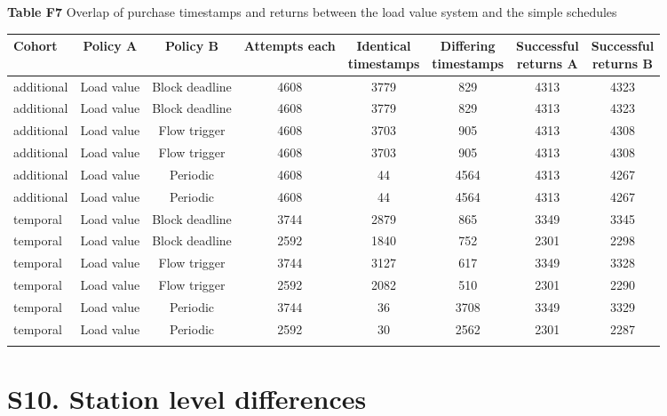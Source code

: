 \documentclass[lineno,pdflatex,sn-apa]{sn-jnl}%
\theoremstyle{thmstyleone}%
\theoremstyle{thmstyletwo}%
\theoremstyle{thmstylethree}%
\begin{document}
\begin{center}
\noindent\textbf{Table F7} Overlap of purchase timestamps and returns between the load value system and the simple schedules
\end{center}

\begin{center}
\footnotesize
\setlength{\tabcolsep}{2pt}
\begin{tabular}{@{}lccccccc@{}}
\toprule
Cohort & Policy A & Policy B & Attempts each & \shortstack{Identical\\timestamps} & \shortstack{Differing\\timestamps} & \shortstack{Successful\\returns A} & \shortstack{Successful\\returns B}\\
\midrule
additional & Load value & Block deadline & 4608 & 3779 & 829 & 4313 & 4323\\
additional & Load value & Block deadline & 4608 & 3779 & 829 & 4313 & 4323\\
additional & Load value & Flow trigger & 4608 & 3703 & 905 & 4313 & 4308\\
additional & Load value & Flow trigger & 4608 & 3703 & 905 & 4313 & 4308\\
additional & Load value & Periodic & 4608 & 44 & 4564 & 4313 & 4267\\
additional & Load value & Periodic & 4608 & 44 & 4564 & 4313 & 4267\\
temporal & Load value & Block deadline & 3744 & 2879 & 865 & 3349 & 3345\\
temporal & Load value & Block deadline & 2592 & 1840 & 752 & 2301 & 2298\\
temporal & Load value & Flow trigger & 3744 & 3127 & 617 & 3349 & 3328\\
temporal & Load value & Flow trigger & 2592 & 2082 & 510 & 2301 & 2290\\
temporal & Load value & Periodic & 3744 & 36 & 3708 & 3349 & 3329\\
temporal & Load value & Periodic & 2592 & 30 & 2562 & 2301 & 2287\\
\botrule
\end{tabular}
\end{center}

\section*{S10. Station level differences}
\end{document}
